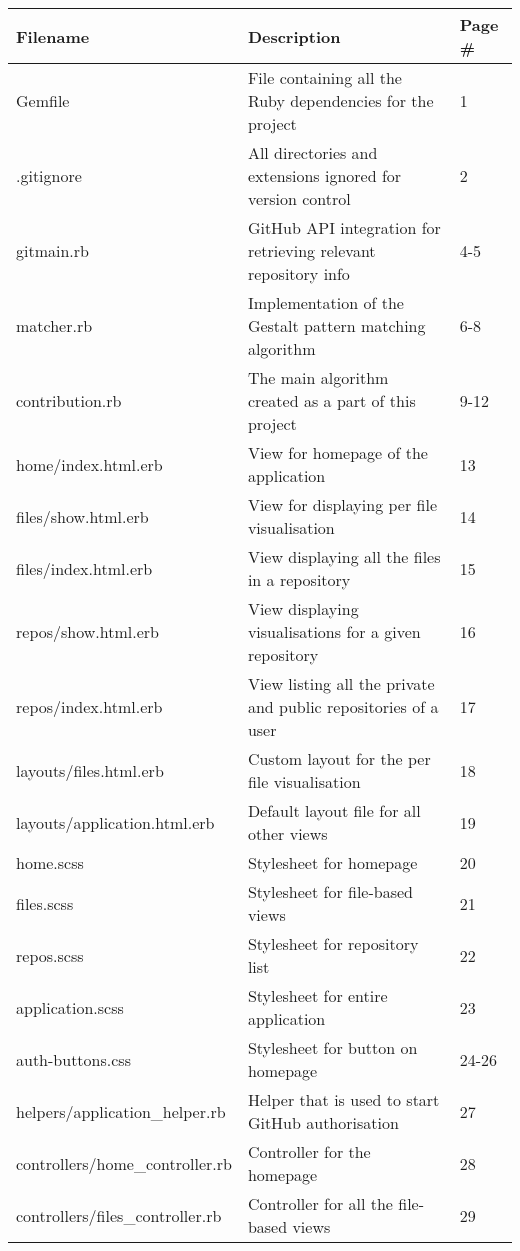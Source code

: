\begin{center}
\begin{tabular}{ | m{15em} | m{18em}| m{4em} | } 
\hline
\textbf{Filename} & \textbf{Description} & \textbf{Page \#} \\ \hline

Gemfile & File containing all the Ruby dependencies for the project & 1 \\ \hline
.gitignore & All directories and extensions ignored for version control & 2 \\ \hline
gitmain.rb & GitHub API integration for retrieving relevant repository info & 4-5  \\\hline
matcher.rb & Implementation of the Gestalt pattern matching algorithm & 6-8 \\ \hline
contribution.rb & The main algorithm created as a part of this project & 9-12 \\ \hline
home/index.html.erb & View for homepage of the application & 13 \\ \hline
files/show.html.erb & View for displaying per file visualisation & 14 \\ \hline
files/index.html.erb & View displaying all the files in a repository & 15 \\ \hline
repos/show.html.erb & View displaying visualisations for a given repository & 16  \\ \hline
repos/index.html.erb & View listing all the private and public repositories of a user & 17 \\ \hline
layouts/files.html.erb & Custom layout for the per file visualisation & 18 \\ \hline
layouts/application.html.erb & Default layout file for all other views & 19 \\ \hline
home.scss & Stylesheet for homepage & 20 \\ \hline
files.scss & Stylesheet for file-based views & 21 \\ \hline
repos.scss & Stylesheet for repository list & 22 \\ \hline
application.scss & Stylesheet for entire application & 23 \\ \hline
auth-buttons.css & Stylesheet for button on homepage & 24-26 \\ \hline
helpers/application\_helper.rb & Helper that is used to start GitHub authorisation & 27 \\ \hline
controllers/home\_controller.rb & Controller for the homepage & 28 \\ \hline
controllers/files\_controller.rb & Controller for all the file-based views & 29 \\ \hline
\end{tabular}


\end{center}
